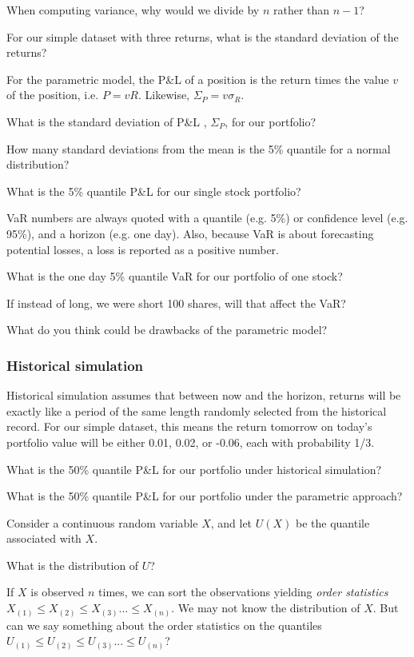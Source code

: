 \documentclass{report}
\numberwithin{problem}{chapter} %
\let\oldroblem\problem
\renewcommand{\problem}{ \oldroblem  \normalfont}
\newcommand{\vs}{\vspace}
\newcommand{\pnl}{P\&L }
\begin{document}
\problem When computing variance, why would we divide by $n$ rather than $n-1$?

\problem For our simple dataset with three returns, what is the standard deviation of the returns?

\vs{.5cm}

For the parametric model, the \pnl of a \gls{position} is the return times the value $v$ of the position, i.e. $P = v R$. Likewise, $\Sigma_P = v \sigma_R$.

\problem What is the standard deviation of \pnl, $\Sigma_P$, for our portfolio?

\problem How many standard deviations from the mean is the 5\% quantile for a normal distribution?

\problem What is the 5\% quantile \pnl for our single stock portfolio?

\gls{VaR} numbers are always quoted with a quantile (e.g. 5\%)  or confidence level (e.g. 95\%), and a horizon (e.g. one day). Also, because VaR is about forecasting potential losses, a loss is reported as a positive number. 

\problem What is the one day 5\% quantile VaR for our portfolio of one stock?

\problem If instead of long, we were short 100 shares, will that affect the VaR?

\problem What do you think could be drawbacks of the parametric model?

\pagebreak 
\subsubsection{Historical simulation}
Historical simulation assumes that between now and the horizon, returns will be exactly like a period of the same length randomly selected from the historical record. For our simple dataset, this means the return tomorrow on today's portfolio value will be either 0.01, 0.02, or -0.06, each with probability 1/3.

\problem What is the 50\% quantile \pnl for our portfolio under historical simulation? 

\problem What is the 50\% quantile \pnl for our portfolio under the parametric approach?

\vs{5mm}
Consider a continuous random variable $X$, and let $U(X)$ be the quantile associated with $X$. 

\problem What is the distribution of $U$? 
\vs{5mm}

If $X$ is  observed $n$ times, we can sort the observations yielding {\it order statistics} $X_{(1)} \leq X_{(2)} \leq X_{(3)} ...  \leq X_{(n)}$. We may not know the distribution of $X$. But can we say something about the order statistics on the quantiles $U_{(1)} \leq U_{(2)} \leq U_{(3)} ...  \leq U_{(n)}$? 
\end{document}
